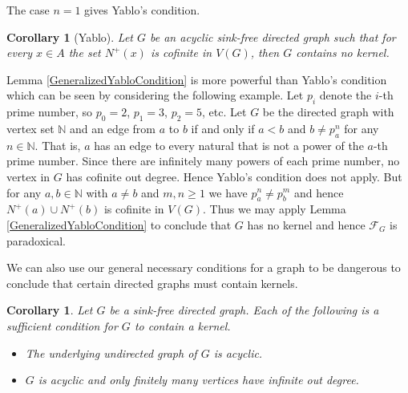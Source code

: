 \documentclass[12pt]{kluwer}
\newtheorem{cor}[thm]{Corollary}
\theoremstyle{remark}
\newcommand{\fancy}[1]{\mathcal{#1}}
\def\F{\fancy{F}}
\def\F{\fancy{F}}
\begin{document}
The case $n = 1$ gives Yablo's condition.
\begin{cor}[Yablo]
Let $G$ be an acyclic sink-free directed graph such that for every $x \in A$ the set $N^+(x)$ is cofinite in $V(G)$, then $G$ contains no kernel.
\end{cor}

Lemma \ref{GeneralizedYabloCondition} is more powerful than Yablo's condition which can be seen by considering the following example.  Let $p_i$ denote the $i$-th prime number, so $p_0 = 2$, $p_1 = 3$, $p_2 = 5$, etc.  Let $G$ be the directed graph with vertex set $\mathbb{N}$ and an edge from $a$ to $b$ if and only if $a < b$ and $b \neq p_a^n$ for any $n \in \mathbb{N}$.  That is, $a$ has an edge to every natural that is not a power of the $a$-th prime number.  Since there are infinitely many powers of each prime number, no vertex in $G$ has cofinite out degree.  Hence Yablo's condition does not apply.  But for any $a, b \in \mathbb{N}$ with $a \neq b$ and $m, n \geq 1$ we have $p_a^n \neq p_b^m$ and hence $N^+(a) \cup N^+(b)$ is cofinite in $V(G)$.  Thus we may apply Lemma \ref{GeneralizedYabloCondition} to conclude that $G$ has no kernel and hence $\F_G$ is paradoxical.\newline

We can also use our general necessary conditions for a graph to be dangerous to conclude that certain directed graphs must contain kernels.

\begin{cor}
Let $G$ be a sink-free directed graph.  Each of the following is a sufficient condition for $G$ to contain a kernel.
\begin{itemize}
\item The underlying undirected graph of $G$ is acyclic.
\item $G$ is acyclic and only finitely many vertices have infinite out degree.
\end{itemize}
\end{cor}






\end{document}
